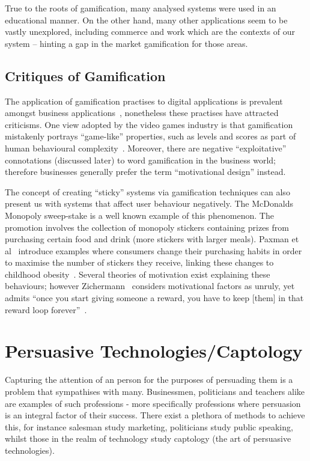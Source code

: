 True to the roots of gamification, many analysed systems were used in an educational manner. On the other hand, many other applications seem to be vastly unexplored, including commerce and work which are the contexts of our system -- hinting a gap in the market gamification for those areas. 

\subsection{Critiques of Gamification}
The application of gamification practises to digital applications is prevalent amongst business applications~\cite{gartner70}, nonetheless these practises have attracted criticisms. One view adopted by the video games industry is that gamification mistakenly portrays ``game-like'' properties, such as levels and scores as part of human behavioural complexity~\cite{bogost2011gamification}. Moreover, there are negative ``exploitative'' connotations (discussed later) to word gamification in the business world; therefore businesses generally prefer the term ``motivational design'' instead. 

The concept of creating ``sticky'' systems via gamification techniques can also present us with systems that affect user behaviour negatively. The McDonalds Monopoly sweep-stake is a well known example of this phenomenon. The promotion involves the collection of monopoly stickers containing prizes from purchasing certain food and drink (more stickers with larger meals). Paxman et al~\cite{mcdonalds} introduce examples where consumers change their purchasing habits in order to maximise the number of stickers they receive, linking these changes to childhood obesity~\cite{mcdonalds}. Several theories of motivation exist explaining these behaviours; however Zichermann~\cite{zichermann2011gamification} considers motivational factors as unruly, yet admits ``once you start giving someone a reward, you have to keep [them] in that reward loop forever''~\cite[p.~27]{zichermann2011gamification}.

\section{Persuasive Technologies/Captology}
Capturing the attention of an person for the purposes of persuading them is a problem that sympathises with many. Businessmen, politicians and teachers alike are examples of such professions - more specifically professions where persuasion is an integral factor of their success. There exist a plethora of methods to achieve this, for instance salesman study marketing, politicians study public speaking, whilst those in the realm of technology study captology (the art of persuasive technologies).

